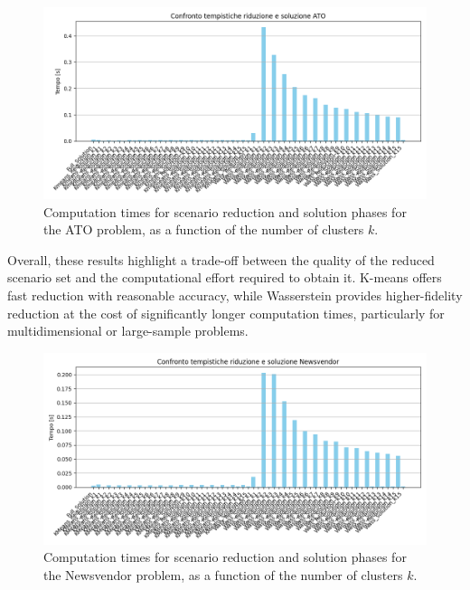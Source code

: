 \documentclass[a4paper,12pt]{article}
\begin{document}
	\begin{figure}[H]
		\centering
		\includegraphics[width=1\textwidth]{../immagini/tempi_ato.png}
		\caption{Computation times for scenario reduction and solution phases for the ATO problem, as a function of the number of clusters $k$.}
		\label{fig:timing-ato}
	\end{figure}
	
	\vspace{0.5em}
	\noindent
	Overall, these results highlight a trade-off between the quality of the reduced scenario set and the computational effort required to obtain it. K-means offers fast reduction with reasonable accuracy, while Wasserstein provides higher-fidelity reduction at the cost of significantly longer computation times, particularly for multidimensional or large-sample problems.
	
	 \begin{figure}[H]
		     \centering
		     \includegraphics[width=1\textwidth]{../immagini/tempi_nv.png}
		     \caption{Computation times for scenario reduction and solution phases for the Newsvendor problem, as a function of the number of clusters $k$.}
		     \label{fig:timing-nv}
		 \end{figure}
	
\end{document}
